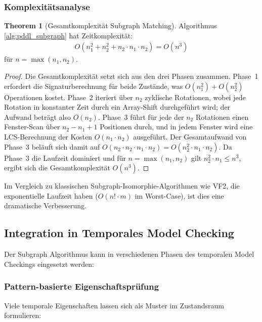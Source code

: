 ﻿\documentclass[a4paper,12pt]{article}
\theoremstyle{definition}
\newtheorem{theorem}{Theorem}[section]
\begin{document}
\subsubsection{Komplexitätsanalyse}

\begin{theorem}[Gesamtkomplexität Subgraph Matching]
	Algorithmus \ref{alg:pddl_subgraph} hat Zeitkomplexität:
	\begin{align}
	O(n_1^2 + n_2^2 + n_2 \cdot n_1 \cdot n_2) = O(n^3)
	\end{align}
	für $n = \max(n_1, n_2)$.
\end{theorem}

\begin{proof}
	Die Gesamtkomplexität setzt sich aus den drei Phasen zusammen. Phase~1 erfordert die Signaturberechnung für beide Zustände, was $O(n_1^2) + O(n_2^2)$ Operationen kostet. Phase~2 iteriert über $n_2$ zyklische Rotationen, wobei jede Rotation in konstanter Zeit durch ein Array-Shift durchgeführt wird; der Aufwand beträgt also $O(n_2)$. Phase~3 führt für jede der $n_2$ Rotationen einen Fenster-Scan über $n_2 - n_1 + 1$ Positionen durch, und in jedem Fenster wird eine LCS-Berechnung der Kosten $O(n_1 \cdot n_2)$ ausgeführt. Der Gesamtaufwand von Phase~3 beläuft sich damit auf $O(n_2 \cdot n_2 \cdot n_1 \cdot n_2) = O(n_2^2 \cdot n_1 \cdot n_2)$. Da Phase~3 die Laufzeit dominiert und für $n = \max(n_1, n_2)$ gilt $n_2^2 \cdot n_1 \leq n^3$, ergibt sich die Gesamtkomplexität $O(n^3)$.
\end{proof}

Im Vergleich zu klassischen Subgraph-Isomorphie-Algorithmen wie VF2, die exponentielle Laufzeit haben ($O(n! \cdot m)$ im Worst-Case), ist dies eine dramatische Verbesserung.

\subsection{Integration in Temporales Model Checking}

Der Subgraph Algorithmus kann in verschiedenen Phasen des temporalen Model Checkings eingesetzt werden:

\subsubsection{Pattern-basierte Eigenschaftsprüfung}

Viele temporale Eigenschaften lassen sich als Muster im Zustandsraum formulieren:
\end{document}
